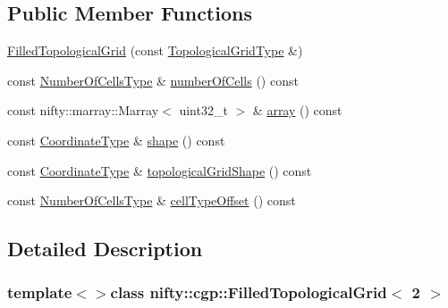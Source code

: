 \subsection*{Public Member Functions}
\begin{DoxyCompactItemize}
\item 
\hyperlink{classnifty_1_1cgp_1_1FilledTopologicalGrid_3_012_01_4_abdd8feabb36e019fb27d2a57c025ae06}{Filled\+Topological\+Grid} (const \hyperlink{classnifty_1_1cgp_1_1FilledTopologicalGrid_3_012_01_4_a18ed401fbaca132c3a3bce16c8f448a9}{Topological\+Grid\+Type} \&)
\item 
const \hyperlink{classnifty_1_1cgp_1_1FilledTopologicalGrid_3_012_01_4_a4026316cb9c7a8e6958cb32e6324ea7d}{Number\+Of\+Cells\+Type} \& \hyperlink{classnifty_1_1cgp_1_1FilledTopologicalGrid_3_012_01_4_aa0bafc4e448a5d9551da464232156f36}{number\+Of\+Cells} () const 
\item 
const nifty\+::marray\+::\+Marray$<$ uint32\+\_\+t $>$ \& \hyperlink{classnifty_1_1cgp_1_1FilledTopologicalGrid_3_012_01_4_a16fae761f377777dc3ab5b134af262ac}{array} () const 
\item 
const \hyperlink{classnifty_1_1cgp_1_1FilledTopologicalGrid_3_012_01_4_a744d1529d7bb50ca95236a5abaded0ad}{Coordinate\+Type} \& \hyperlink{classnifty_1_1cgp_1_1FilledTopologicalGrid_3_012_01_4_a5c90388d6330464471f952eb3c1b1513}{shape} () const 
\item 
const \hyperlink{classnifty_1_1cgp_1_1FilledTopologicalGrid_3_012_01_4_a744d1529d7bb50ca95236a5abaded0ad}{Coordinate\+Type} \& \hyperlink{classnifty_1_1cgp_1_1FilledTopologicalGrid_3_012_01_4_afd3218d481d3e9cb1ecf606435a89c2c}{topological\+Grid\+Shape} () const 
\item 
const \hyperlink{classnifty_1_1cgp_1_1FilledTopologicalGrid_3_012_01_4_a4026316cb9c7a8e6958cb32e6324ea7d}{Number\+Of\+Cells\+Type} \& \hyperlink{classnifty_1_1cgp_1_1FilledTopologicalGrid_3_012_01_4_a1ea2d0f4dd3c2db9780bac1740a3bc18}{cell\+Type\+Offset} () const 
\end{DoxyCompactItemize}


\subsection{Detailed Description}
\subsubsection*{template$<$$>$class nifty\+::cgp\+::\+Filled\+Topological\+Grid$<$ 2 $>$}

